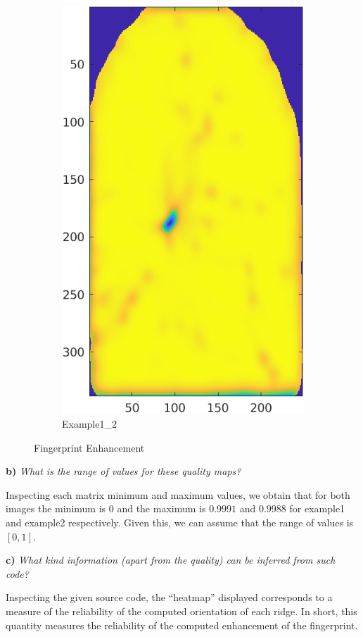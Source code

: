 \documentclass[11pt]{article}
\begin{document}
\begin{figure}[h!]
\begin{subfigure}[t]{0.45\textwidth}
         \includegraphics[scale=0.96]{img/qmap_2}
         \caption{Example1\_2}
     \end{subfigure}
    \caption{Fingerprint Enhancement}
\end{figure}

\textbf{b) }\emph{What is the range of values for these quality maps?}

Inspecting each matrix minimum and maximum values, we obtain that for both images the minimum is \( 0 \) and the maximum is \( 0.9991 \) and \(  0.9988 \) for example1 and example2 respectively. Given this, we can assume that the range of values is \( [0, 1] \).

\textbf{c) }\emph{What kind information (apart from the quality) can be inferred from such code?}

Inspecting the given source code, the ``heatmap'' displayed corresponds to a measure of the reliability of the computed orientation of each ridge. In short, this quantity measures the reliability of the computed enhancement of the fingerprint.
\end{document}
